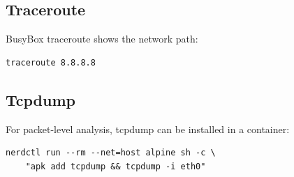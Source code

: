 \subsection{Traceroute}

BusyBox traceroute shows the network path:

\begin{lstlisting}
traceroute 8.8.8.8
\end{lstlisting}

\subsection{Tcpdump}

For packet-level analysis, tcpdump can be installed in a container:

\begin{lstlisting}
nerdctl run --rm --net=host alpine sh -c \
    "apk add tcpdump && tcpdump -i eth0"
\end{lstlisting}
